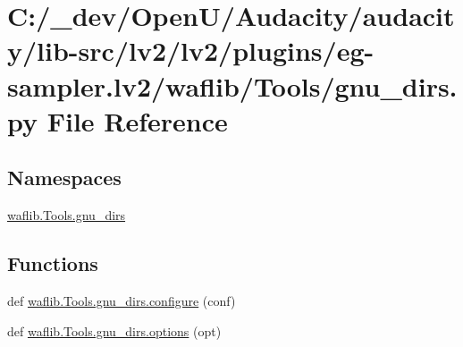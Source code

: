 \hypertarget{lv2_2plugins_2eg-sampler_8lv2_2waflib_2_tools_2gnu__dirs_8py}{}\section{C\+:/\+\_\+dev/\+Open\+U/\+Audacity/audacity/lib-\/src/lv2/lv2/plugins/eg-\/sampler.lv2/waflib/\+Tools/gnu\+\_\+dirs.py File Reference}
\label{lv2_2plugins_2eg-sampler_8lv2_2waflib_2_tools_2gnu__dirs_8py}
\subsection*{Namespaces}
\begin{DoxyCompactItemize}
\item 
 \hyperlink{namespacewaflib_1_1_tools_1_1gnu__dirs}{waflib.\+Tools.\+gnu\+\_\+dirs}
\end{DoxyCompactItemize}
\subsection*{Functions}
\begin{DoxyCompactItemize}
\item 
def \hyperlink{namespacewaflib_1_1_tools_1_1gnu__dirs_a03d9dce5a06f4f739652667447f57eb9}{waflib.\+Tools.\+gnu\+\_\+dirs.\+configure} (conf)
\item 
def \hyperlink{namespacewaflib_1_1_tools_1_1gnu__dirs_ad291b2ee61d479ae1005acd11eaf6ead}{waflib.\+Tools.\+gnu\+\_\+dirs.\+options} (opt)
\end{DoxyCompactItemize}
